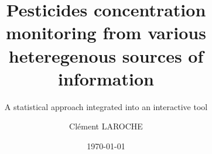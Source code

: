 \usepackage{apacite}
\usepackage{natbib}
\usepackage{bibentry}
\makeatletter 
 \renewcommand\BR@b@bibitem[2][]{\BR@bibitem[#1]{#2}\BR@c@bibitem{#2}}           
 \makeatother
\nobibliography*
\usepackage[utf8]{inputenc}
\usepackage[a4paper, width=170mm,top=25mm,bottom=15mm]{geometry}
\usepackage{graphicx}    
\graphicspath{{figs/}} 
\usepackage[toc,page]{appendix}
\usepackage{todonotes}
\usepackage{float}
\usepackage{caption}
\usepackage{subcaption}  
\usepackage{amsmath}  
\usepackage{amsthm}  
\usepackage{amsfonts}
\usepackage{amssymb}   
\usepackage{amsthm}
\usepackage{thmtools}
\usepackage{indentfirst} 
\usepackage{url}
\usepackage{hyperref}
\usepackage{algorithm, algpseudocode}
\usepackage{algorithmicx, mathtools}
\usepackage{wrapfig}
\usepackage{breqn}
\usepackage{titlesec, color}
\usepackage{ifthen}
\usepackage{diagbox}
\usepackage{etoolbox}
\usepackage[english]{minitoc}
\usepackage{bbm, bm}
\usepackage{makeidx}
\usepackage{pdfpages}
\setcounter{minitocdepth}{4}
\newcommand{\clem}[1]{\todo[inline,color=red!20!white]{\textbf{Clement:} #1}}
\newcommand{\NN}{{\mathbb N}}
\newcommand{\PP}{{\mathbb P}}
\newcommand{\CC}{{\mathcal C}}
\newcommand{\OO}{{\mathcal O}}
\newcommand{\TT}{{\mathcal T}}
\newcommand{\maxy}{\overline{y}}
\newcommand{\maxquant}{\overline{q}}
\newcommand{\vmaxy}{\overline{Y}}

\makeindex

\title{Pesticides concentration monitoring from various heteregenous sources of information}
\subtitle{A statistical approach integrated into an interactive tool}
\author{Clément LAROCHE}
\date{\today}









